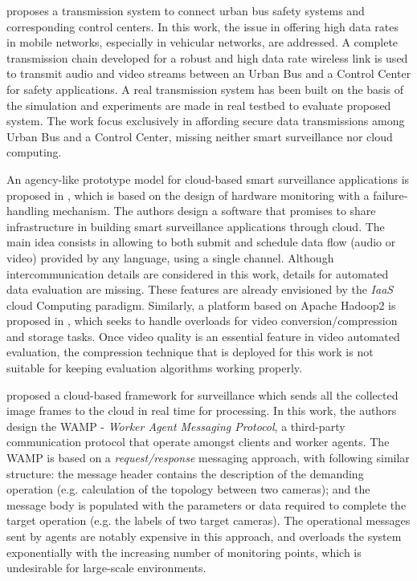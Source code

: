 \cite{Moniak2007} proposes a transmission system to connect urban bus safety systems and corresponding control centers. In this work, the issue in offering high data rates in mobile networks, especially in vehicular networks, are addressed. A complete transmission chain developed for a robust and high data rate wireless link is used to transmit audio and video streams between an Urban Bus and a Control Center for safety applications. A real transmission system has been built on the basis of the simulation and experiments are made in real testbed to evaluate proposed system. The work focus exclusively in affording secure data transmissions among Urban Bus and a Control Center, missing neither smart surveillance nor cloud computing.  

An agency-like prototype model for cloud-based smart surveillance applications is proposed in \cite{FANG2013}, which is based on the design of hardware monitoring with a failure-handling mechanism. The authors design a software that promises to share infrastructure in building smart surveillance applications through cloud. The main idea consists in allowing to both submit and schedule data flow (audio or video) provided by any language, using a single channel. Although intercommunication details are considered in this work, details for automated data evaluation are missing. These features are already envisioned by the \textit{IaaS} cloud Computing paradigm. Similarly, a platform based on Apache Hadoop2 is proposed in \cite{Xiang2013}, which seeks to handle overloads for video conversion/compression and storage tasks. Once video quality is an essential feature in video automated evaluation, the compression technique that is deployed for this work is not suitable for keeping evaluation algorithms working properly.

\cite{Wen2010} proposed a cloud-based framework for surveillance which sends all the collected image frames to the cloud in real time for processing. In this work, the authors design the  WAMP - \textit{Worker Agent Messaging Protocol}, a third-party communication protocol that operate amongst clients and worker agents. The WAMP is based on a \textit{request/response} messaging approach, with following similar structure: the message header contains the description of the demanding operation (e.g. calculation of the topology between two cameras); and the message body is populated with the parameters or data required to complete the target operation (e.g. the labels of two target cameras). The operational messages sent by agents are notably expensive in this approach, and overloads the system exponentially with the increasing number of monitoring points, which is undesirable for large-scale environments.

